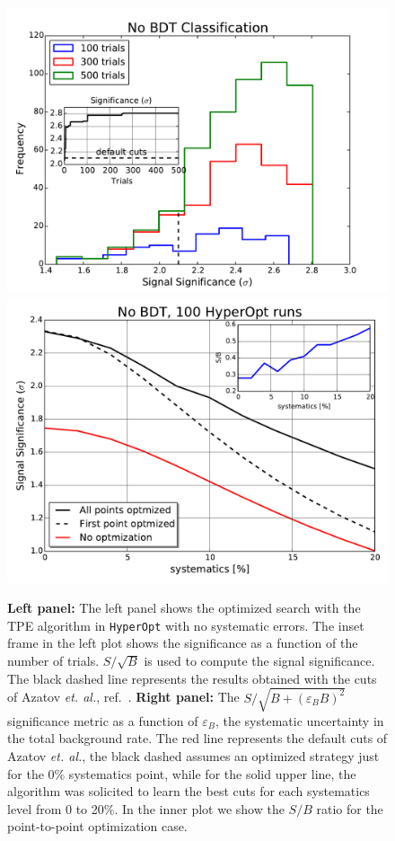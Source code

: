 \begin{figure}[!t]
\centering
\includegraphics[scale=0.35]{./section3/plots/improve_HHH_cuts.pdf}
\includegraphics[scale=0.35]{./section3/plots/ams_HHH_sys_compare.pdf}
\caption{\textbf{Left panel:} The left panel shows the optimized search with the TPE algorithm in \texttt{HyperOpt} with no systematic errors. The inset frame in the left plot shows the significance as a function of the number of trials. $S/\sqrt{B}$ is used to compute the signal significance. The black dashed line represents the results obtained with the cuts of Azatov \emph{et. al.}, ref.~\cite{Azatov:2015oxa}. \textbf{Right panel:} The $S/\sqrt{B+(\varepsilon_B B)^2}$ significance metric as a  function of $\varepsilon_B$, the systematic uncertainty in the total background rate. The red line represents the default cuts of Azatov \emph{et. al.}, the black dashed assumes an optimized strategy just for the 0\% systematics point, while for the solid upper line, the algorithm was solicited to learn the best cuts for each systematics level from 0 to 20\%. In the inner plot we show the $S/B$ ratio for the point-to-point optimization case. }
\label{fig:BayesianKS}
\end{figure}
%


